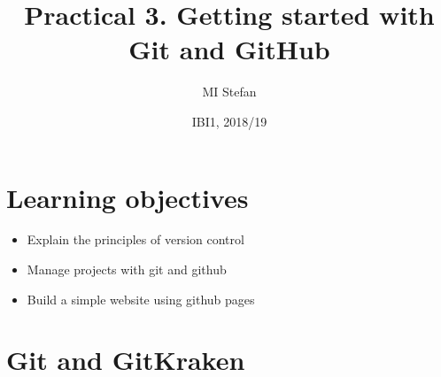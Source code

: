 \documentclass[pdflatex,a4paper]{article}
\title{Practical 3. Getting started with Git and GitHub}
\author{MI Stefan}
\date{IBI1, 2018/19}
\begin{document}
\newcommand{\<}{\textless}
\renewcommand{\>}{\textgreater}


\maketitle

\section{Learning objectives}

\begin{itemize}
\item
Explain the principles of version control
\item
Manage projects with git and github
\item
Build a simple website using github pages
\end{itemize}

\section{Git and GitKraken}
\end{document}
